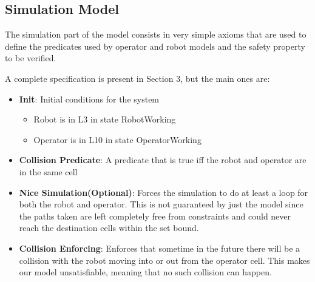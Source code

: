 
\subsection{Simulation Model}
The simulation part of the model consists in very simple axioms that are used to define the predicates used by operator and robot models and the safety property to be verified.

A complete specification is present in Section 3, but the main ones are:
\begin{itemize}
	\item \textbf{Init}: Initial conditions for the system
	\begin{itemize}
		\item Robot is in L3 in state RobotWorking
		\item Operator is in L10 in state OperatorWorking
	\end{itemize}
	
	\item \textbf{Collision Predicate}: A predicate that is true iff the robot and operator are in the same cell
	
	\item \textbf{Nice Simulation(Optional)}: Forces the simulation to do at least a loop for both the robot and operator. This is not guaranteed by just the model since the paths taken are left completely free from constraints and could never reach the destination cells within the set bound.
	
	
	\item \textbf{Collision Enforcing}: Enforces that sometime in the future there will be a collision with the robot moving into or out from the operator cell. This makes our model unsatisfiable, meaning that no such collision can happen.
\end{itemize}


